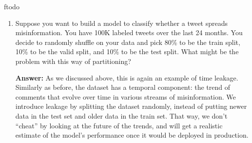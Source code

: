 ƒtodo\documentclass{article}
\newenvironment{QandA}{\begin{enumerate}[label=\arabic*.]}{\end{enumerate}}
\newenvironment{InnerQandA}{\begin{enumerate}[label=\roman*.]}{\end{enumerate}}
\newenvironment{answer}{\par\normalfont \textbf{Answer:}}{}
\begin{document}
\begin{QandA}
\begin{InnerQandA}
        \item How do you detect feature leakage?
        \begin{answer}
            Several cases that can indicate potential feature leakage:
            \begin{itemize}
                \item The model performance is too good to be true.
                \item A feature has abnormally high correlation with the target value.
                \item After training, the model weights for a given feature are significantly higher than the others.
            \end{itemize}
            (See more \href{https://www.analyticsvidhya.com/blog/2021/07/data-leakage-and-its-effect-on-the-performance-of-an-ml-model/}{here}.)
        \end{answer}
    \end{InnerQandA}

    \item Suppose you want to build a model to classify whether a tweet spreads misinformation. You have 100K labeled tweets over the last 24 months. You decide to randomly shuffle on your data and pick 80\% to be the train split, 10\% to be the valid split, and 10\% to be the test split. What might be the problem with this way of partitioning?
    \begin{answer}
        As we discussed above, this is again an example of time leakage. Similarly as before, the dataset has a temporal component: the trend of comments that evolve over time in various streams of misinformation. We introduce leakage by splitting the dataset randomly, instead of putting newer data in the test set and older data in the train set. That way, we don't ``cheat'' by looking at the future of the trends, and will get a realistic estimate of the model's performance once it would be deployed in production. 
    \end{answer}


\end{QandA}
\end{document}
